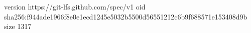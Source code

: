 version https://git-lfs.github.com/spec/v1
oid sha256:f944ade1966f8e0e1ecd1245e5032b5500d56551212c6b9f688571e153408d9b
size 1317
